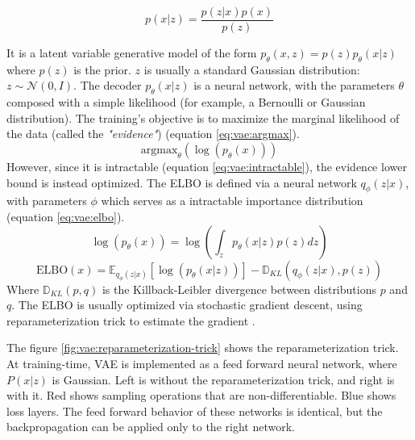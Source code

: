 \documentclass[12pt]{report}
\begin{document}
\begin{equation}
    p(x|z) = \frac{p(z|x) p(x)}{p(z)}
    \label{eq:bayesian-theorem}
\end{equation}

It is a latent variable generative model of the form $p_{\theta}(x, z) = p(z)p_{\theta}(x|z)$ where $p(z)$ is the prior.
$z$ is usually a standard Gaussian distribution: $z \sim \mathcal{N} (0, I)$.
The decoder $p_{\theta}(x|z)$ is a neural network, with the parameters $\theta$ composed with a simple likelihood (for example, a Bernoulli or Gaussian distribution).
The training's objective is to maximize the marginal likelihood of the data (called the \textit{"evidence"}) (equation \ref{eq:vae:argmax}).
\begin{equation}
    \text{argmax}_{\theta} (\log(p_{\theta} (x)))
    \label{eq:vae:argmax}
\end{equation}
However, since it is intractable (equation \ref{eq:vae:intractable}), the evidence lower bound is instead optimized. The ELBO is defined via a neural network $q_{\phi}(z|x)$, with parameters $\phi$ which serves as a intractable importance distribution (equation \ref{eq:vae:elbo}).
\begin{equation}
    \log (p_{\theta} (x)) = \log \left( \int_{z} p_{\theta} (x|z) p(z) dz\right)
    \label{eq:vae:intractable}
\end{equation}
\begin{equation}
    \text{ELBO}(x) = \mathbb{E}_{q_{\phi}(z|x)} \left[ \log (p_{\theta}(x|z)) \right] - \mathbb{D}_{KL} \left( q_{\phi}(z|x), p(z) \right)
    \label{eq:vae:elbo}
\end{equation}
Where $\mathbb{D}_{KL}(p, q)$ is the Killback-Leibler divergence between distributions $p$ and $q$.
The ELBO is usually optimized via stochastic gradient descent, using reparameterization trick to estimate the gradient \cite{kingma_auto-encoding_2014}.

The figure \ref{fig:vae:reparameterization-trick} shows the reparameterization trick.
At training-time, VAE is implemented as a feed forward neural network, where $P(x|z)$ is Gaussian.
Left is without the reparameterization trick, and right is with it.
Red shows sampling operations that are non-differentiable.
Blue shows loss layers.
The feed forward behavior of these networks is identical, but the backpropagation can be applied only to the right network.
\end{document}
